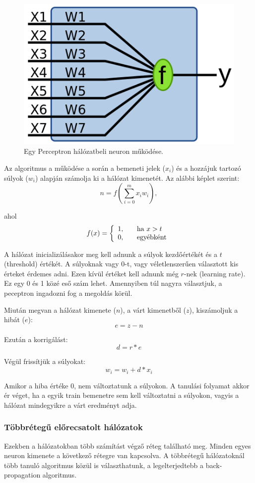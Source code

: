 \documentclass[a4paper]{article}
\begin{document}
\begin{figure}
  \centering
  \includegraphics[scale=0.3]{Perceptron}
  \caption{Egy Perceptron hálózatbeli neuron működése.}
  \label{forward_neuron}
\end{figure}

Az algoritmus a működése a során a bemeneti jelek ($x_{i}$) és a hozzájuk tartozó súlyok ($w_{i}$) alapján számolja ki a hálózat kimenetét. Az alábbi képlet szerint:
$${ n = f(\sum_{i=0}^{m} x_{i}w_{i})},$$

ahol
\[ f(x) = \left\{
  \begin{array}{l l}
    1, & \quad \textrm{ha $x > t$}\\
    0, & \quad \textrm{egyébként}
  \end{array} \right.\]

A hálózat inicializálásakor meg kell adnunk a súlyok kezdőértékét és a $t$ (threshold) értékét. A súlyoknak vagy 0-t, vagy véletlenszerűen választott kis érteket érdemes adni. Ezen kívül értéket kell adnunk még $r$-nek (learning rate). Ez egy 0 és 1 közé eső szám lehet. Amennyiben túl nagyra választjuk, a peceptron ingadozni fog a megoldás körül.

Miután megvan a hálózat kimenete ($n$), a várt kimenetből ($z$), kiszámoljuk a hibát ($e$):
$$e = z - n$$

Ezután a korrigálást:
$$d = r * e $$

Végül frissítjük a súlyokat:
$$w_{i} = w_{i} + d * x_{i}$$

Amikor a hiba értéke 0, nem változtatunk a súlyokon. A tanulási folyamat akkor ér véget, ha a egyik train bemenetre sem kell változtatni a súlyokon, vagyis a hálózat mindegyikre a várt eredményt adja.

\subsubsection{Többrétegű előrecsatolt hálózatok}
Ezekben a hálózatokban több számítást végző réteg található meg. Minden egyes neuron kimenete a következő rétegre van kapcsolva. A többrétegű hálózatoknál több tanuló algoritmus közül is választhatunk, a legelterjedtebb a back-propagation algoritmus.
\end{document}

